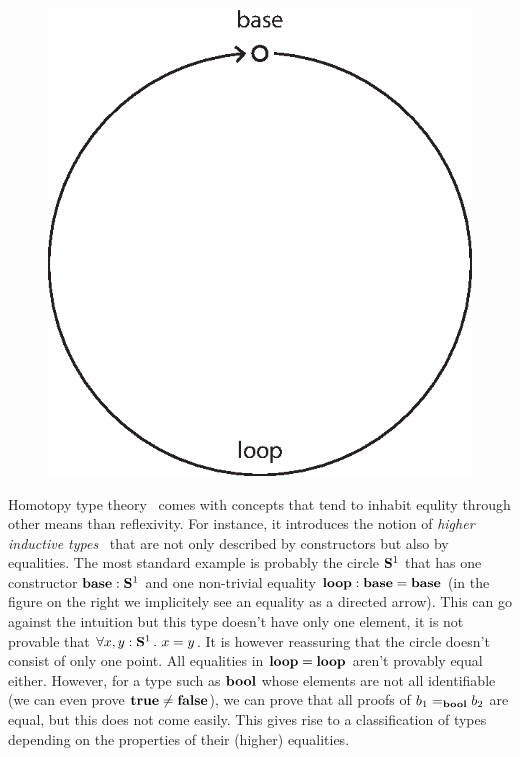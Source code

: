 \documentclass[11pt]{article}
\theoremstyle{plain}
\theoremstyle{remark}
\begin{document}
\begin{figure}
    \centering
    \includegraphics[scale=.4]{s1.eps}
\end{figure}
Homotopy type theory~\cite{HoTTbook} comes with concepts that tend to inhabit
equlity through other means than reflexivity. For instance, it introduces the
notion of \emph{higher inductive types}~\cite{lumsdaine2013higher} that are not
only described by constructors but also by equalities.
The most standard example is probably the circle $\S1$ that has one constructor
$\base : \S1$ and one non-trivial equality $\operatorname{\mathbf{loop}} : \operatorname{\mathbf{base}} = \operatorname{\mathbf{base}}$
(in the figure on the right we implicitely see an equality as a directed arrow).
This can go against the intuition but this type doesn't have only one element,
\ie it is not provable that $\forall x,y : \S1.\ x = y$. It is however
reassuring that the circle doesn't consist of only one point.
All equalities in $\operatorname{\mathbf{loop}} = \operatorname{\mathbf{loop}}$ aren't provably equal either.
However, for a type such as $\operatorname{\mathbf{bool}}$ whose elements are not all
identifiable (we can even prove $\operatorname{\mathbf{true}} \neq \operatorname{\mathbf{false}}$), we can prove that all
proofs of $b_1 =_{\operatorname{\mathbf{bool}}} b_2$ are equal, but this does not come easily.
This gives rise to a classification of types depending on the properties
of their (higher) equalities.
\end{document}
